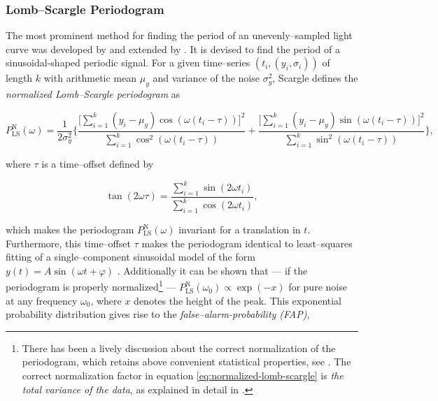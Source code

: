 \subsubsection{Lomb--Scargle Periodogram}
\label{subsubsec:lomb-scargle}

The most prominent method for finding the period of an unevenly--sampled light curve was developed by \citet{lomb1976} and extended by \citet{scargle1982}. It is devised to find the period of a sinusoidal-shaped periodic signal. For a given time--series $(t_i, (y_i, \sigma_i))$ of length $k$ with arithmetic mean $\mu_y$ and variance of the noise $\sigma_y^2$, Scargle defines the \emph{normalized Lomb--Scargle periodogram} as

\begin{equation}
\label{eq:normalized-lomb-scargle}
P^{\text{N}}_{\text{LS}}(\omega) = \frac{1}{2 \sigma_y^2} \Bigg\{ \frac{\big[\sum\limits_{i=1}^k (y_i - \mu_y) \cos(\omega(t_i - \tau))\big]^2}{\sum\limits_{i=1}^k \cos^2(\omega(t_i - \tau))} + \frac{\big[\sum\limits_{i=1}^k (y_i - \mu_y) \sin(\omega(t_i - \tau))\big]^2}{\sum\limits_{i=1}^k \sin^2(\omega(t_i - \tau))}\Bigg\},
\end{equation}

where $\tau$ is a time--offset defined by

\begin{equation}
\tan(2 \omega \tau) = \frac{\sum\limits_{i=1}^k \sin(2 \omega t_i)}{\sum\limits_{i=1}^k \cos(2 \omega t_i)},
\end{equation}

which makes the periodogram $P^{\text{N}}_{\text{LS}}(\omega)$ invariant for a translation in $t$. Furthermore, this time--offset $\tau$ makes the periodogram identical to least--squares fitting of a single--component sinusoidal model of the form $y(t) = A \sin(\omega t + \varphi)$ \citep{horne1986, vanderplas2015}. Additionally it can be shown that --- if the periodogram is properly normalized\footnote{There has been a lively discussion about the correct normalization of the periodogram, which retains above convenient statistical properties, see \citet{lomb1976,astroML,zechmeister2009}. The correct normalization factor in equation \eqref{eq:normalized-lomb-scargle} is \emph{the total variance of the data}, as explained in detail in \citet{horne1986}.} --- $P^{\text{N}}_{\text{LS}}(\omega_0) \propto \exp(-x)$ for pure noise at any frequency $\omega_0$, where $x$ denotes the height of the peak. This exponential probability distribution gives rise to the \emph{false--alarm-probability (FAP)},

